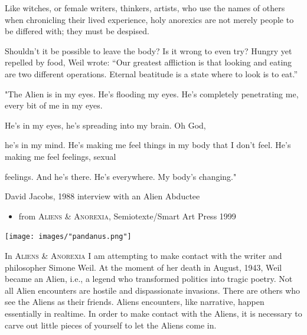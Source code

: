 \documentclass[
]{memoir}
\providecommand{\tightlist}{%
  \setlength{\itemsep}{0pt}\setlength{\parskip}{0pt}}
\begin{document}
Like witches, or female writers, thinkers, artists, who use the names of
others when chronicling their lived experience, holy anorexics are not
merely people to be differed with; they must be despised.

Shouldn't it be possible to leave the body? Is it wrong to even try?
Hungry yet repelled by food, Weil wrote: ``Our greatest affliction is
that looking and eating are two different operations. Eternal beatitude
is a state where to look is to eat.''

"The Alien is in my eyes. He's flooding my eyes. He's completely
penetrating me, every bit of me in my eyes.

He's in my eyes, he's spreading into my brain. Oh God,

he's in my mind. He's making me feel things in my body that I don't
feel. He's making me feel feelings, sexual

feelings. And he's there. He's everywhere. My body's changing."

David Jacobs, 1988 interview with an Alien Abductee

\begin{itemize}
\tightlist
\item
  from \textsc{Aliens \& Anorexia}, Semiotexte/Smart Art Press 1999
\end{itemize}

\begin{center}\texttt{[image: images/"pandanus.png"]}\end{center}

In \textsc{Aliens \& Anorexia} I am attempting to make contact with the
writer and philosopher Simone Weil. At the moment of her death in
August, 1943, Weil became an Alien, i.e., a legend who transformed
politics into tragic poetry. Not all Alien encounters are hostile and
dispassionate invasions. There are others who see the Aliens as their
friends. Aliens encounters, like narrative, happen essentially in
realtime. In order to make contact with the Aliens, it is necessary to
carve out little pieces of yourself to let the Aliens come in.
\end{document}
